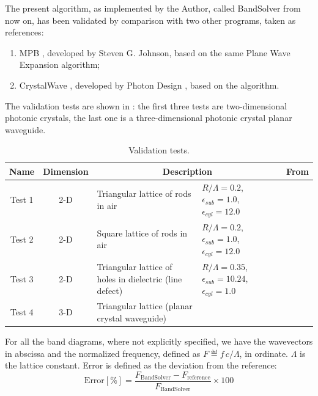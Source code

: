 The present algorithm, as implemented by the Author, called
BandSolver from now on, has been validated by comparison with
two other programs, taken as references:
\begin{enumerate}
\item
  MPB \cite{mpb}, developed by Steven G. Johnson, based on the same
  Plane Wave Expansion algorithm;
\item
  CrystalWave \cite{crystalwave}, developed by Photon Design \cite{photond},
  based on the \FDTD algorithm.
\end{enumerate}

The validation tests are shown in : the
first three tests are two-dimensional photonic crystals, the last one
is a three-dimensional photonic crystal planar waveguide.

\begin{table}[htbp]
  \begin{center}
    \begin{tabular}{ccp{3cm}p{3cm}c}
      \hline
      Name & Dimension & \multicolumn{2}{c}{Description} & From \\
      \hline
      Test 1 & 2-D & Triangular lattice of rods in air & $R/\Lambda = 0.2$, $\epsilon_{sub} = 1.0$, $\epsilon_{cyl} = 12.0$ & \cite{mpb} \\
      Test 2 & 2-D & Square lattice of rods in air & $R/\Lambda = 0.2$, $\epsilon_{sub} = 1.0$, $\epsilon_{cyl} = 12.0$ & \cite{johnson_photonic} \\
      Test 3 & 2-D & Triangular lattice of holes in dielectric (line defect) & $R/\Lambda = 0.35$, $\epsilon_{sub} = 10.24$, $\epsilon_{cyl} = 1.0$ & \cite{crystalwave} \\
      Test 4 & 3-D & Triangular lattice (planar crystal waveguide) & & \cite{johnson_photonic} \\
      \hline
    \end{tabular}
  \end{center}
  \caption{Validation tests.}
  \label{tab:validation_tests}
\end{table}

For all the band diagrams, where not explicitly specified, we have the
wavevectors in abscissa and the normalized frequency, defined as $F
\eqdef f\, c/\Lambda$, in ordinate. $\Lambda$ is the lattice
constant. Error is defined as the deviation from the reference:
\begin{equation*}
  \text{Error} [\%] = \frac{F_{\text{BandSolver}} -
  F_{\text{reference}}}{F_{\text{BandSolver}}} \times 100
\end{equation*}
  
